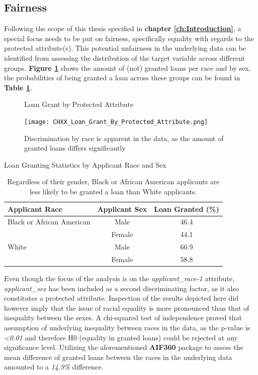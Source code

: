 \subsection{Fairness}\label{subsec:Fairness}

Following the scope of this thesis specified in \textbf{chapter \ref{ch:Introduction}}, a special focus needs to be put  on fairness, specifically equality with regards to the protected attribute(s).
This potential unfairness in the underlying data can be identified from assessing the distribution of the target variable across different groups.
\textbf{Figure \ref{fig:CHXX_Loan_Grant_By_Protected_Attribute}} shows the amount of (not) granted loans per race and by sex, the probabilities of being granted a loan across these groups can be found in \textbf{Table \ref{tab:loan_granting}}.\@

\begin{figure}[h]
    \centering
    \caption{Loan Grant by Protected Attribute}
    \texttt{[image: CHXX\_Loan\_Grant\_By\_Protected\_Attribute.png]}
    \caption*{Discrimination by race is apparent in the data, as the amount of granted loans differs significantly}
    \label{fig:CHXX_Loan_Grant_By_Protected_Attribute}
\end{figure}

\begin{table}[htbp]
    \centering
      \caption{Loan Granting Statistics by Applicant Race and Sex}
      \begin{tabular}{lcc}
      \toprule
      \textbf{Applicant Race} & \textbf{Applicant Sex} & \textbf{Loan Granted (\%)} \\
      \midrule
      Black or African American & Male    & 46.4 \\
            & Female  & 44.1 \\
      White & Male    & 60.9 \\
            & Female  & 58.8 \\
      \bottomrule
      \end{tabular}
      \caption*{Regardless of their gender, Black or African American applicants are less likely to be granted a loan than White applicants.}
    \label{tab:loan_granting}%
\end{table}%

Even though the focus of the analysis is on the \textit{applicant\_race-1} attribute, \textit{applicant\_sex} has been included as a second discriminating factor, as it also constitutes a protected attribute.
Inspection of the results depicted here did however imply that the issue of racial equality is more pronounced than that of inequality between the sexes.
A chi-squared test of independence proved that assumption of underlying inequality between races in the data, as the p-value is \textit{<0.01} and therefore H0 (equality in granted loans) could be rejected at any significance level.
Utilizing the aforementioned \textbf{AIF360} package to assess the mean difference of granted loans between the races in the underlying data amounted to a \textit{14.9\%} difference.

